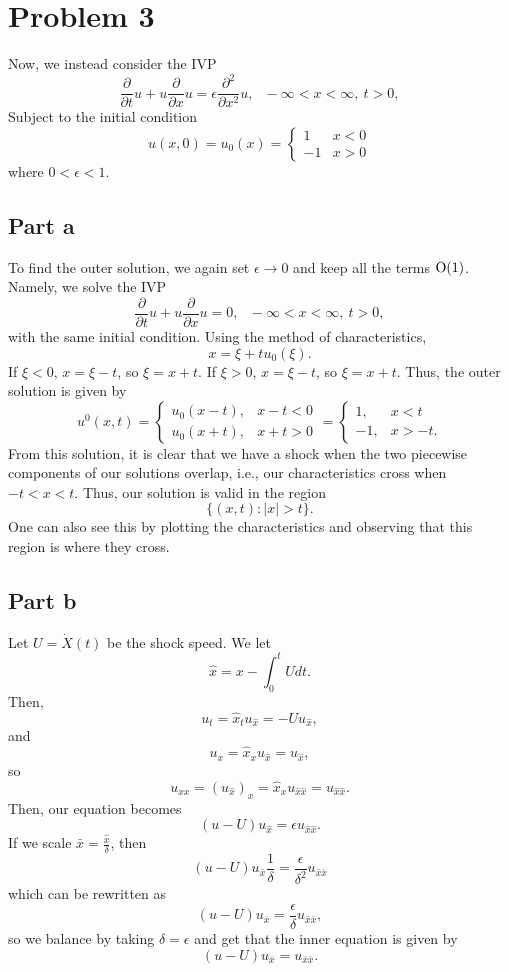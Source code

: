 \documentclass{article}
\begin{document}
\section{Problem 3}
Now, we instead consider the IVP 
	\[
\frac{\partial }{\partial t}u+u\frac{\partial }{\partial x}u= \epsilon \frac{\partial^2 }{\partial x^2}u, ~~~ - \infty < x < \infty, ~ t > 0,
\]
Subject to the initial condition
\[
u(x,0) =u_0(x)= \begin{cases}
	1 & x < 0 \\
	-1 & x > 0 
\end{cases}
\]
where $0<\epsilon<1$.

\subsection{Part a}
To find the outer solution, we again set $\epsilon\to0$ and keep all the terms $\operatorname{O}(1)$. Namely, we solve the IVP
\[
\frac{\partial }{\partial t}u+u\frac{\partial }{\partial x}u= 0, ~~~ - \infty < x < \infty, ~ t > 0,
\]
with the same initial condition. Using the method of characteristics,
\[
x=\xi+tu_0(\xi).
\]
If $\xi<0$, $x=\xi-t$, so $\xi=x+t$. If $\xi>0$, $x=\xi-t$, so $\xi=x+t$. Thus, the outer solution is given by
\[
u^0(x,t)=
\begin{cases}
	u_0(x-t), &x-t<0\\
	u_0(x+t), &x+t>0
\end{cases}=
\begin{cases}
	1, &x<t\\
	-1, &x>-t.
\end{cases}
\]
From this solution, it is clear that we have a shock when the two piecewise components of our solutions overlap, i.e., our characteristics cross when $-t<x<t$. Thus, our solution is valid in the region
\[
\{(x,t):|x|> t\}.
\]
One can also see this by plotting the characteristics and observing that this region is where they cross. 

\subsection{Part b}
Let $U=\dot{X}(t)$ be the shock speed. We let
\[
\hat{x}= x-\int_0^t Udt.
\]
Then, 
\[
u_t=\hat{x}_tu_{\hat{x}}=-Uu_{\hat{x}},
\]
and 
\[
u_x=\hat{x}_xu_{\hat{x}}=u_{\hat{x}},
\]
so 
\[
u_{xx}=(u_{\hat{x}})_x=\hat{x}_xu_{\hat{x}\hat{x}}=u_{\hat{x}\hat{x}}.
\]
Then, our equation becomes
\[
(u-U)u_{\hat{x}}=\epsilon u_{\hat{x}\hat{x}}.
\]
If we scale $\bar{x}=\frac{\hat{x}}{\delta}$, then 
\[
(u-U)u_{\bar{x}}\frac{1}{\delta}=\frac{\epsilon}{\delta^2} u_{\bar{x}\bar{x}}
\]
which can be rewritten as 
\[
(u-U)u_{\bar{x}}=\frac{\epsilon}{\delta} u_{\bar{x}\bar{x}},
\]
so we balance by taking $\delta=\epsilon$ and get that the inner equation is given by
\[
(u-U)u_{\bar{x}}=u_{\bar{x}\bar{x}}.
\]
\end{document}
